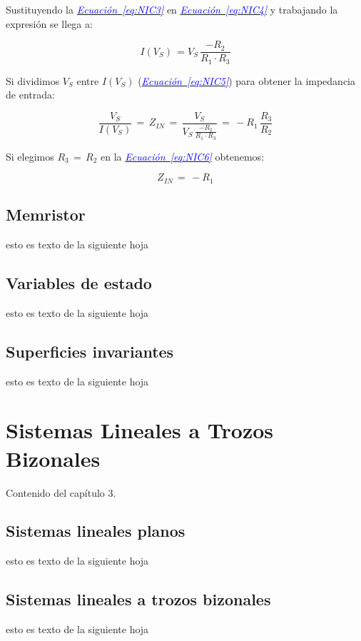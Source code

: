 \documentclass[12pt,a4paper]{report} %
\newcommand{\equationref}[1]{\hyperref[#1]{\textcolor{blue}{\textit{Ecuación~\ref*{#1}}}}}
\begin{document}
	Sustituyendo la \equationref{eq:NIC3} en \equationref{eq:NIC4} y trabajando la expresión se llega a:
	
	\begin{equation}
		I(V_S)\,=V_S\,\frac{-R_2}{R_1 \cdot R_3}
		\label{eq:NIC5}
	\end{equation}\smallskip
	
	Si dividimos $V_S$ entre $I(V_S)$ (\equationref{eq:NIC5}) para obtener la impedancia de entrada:
	
	\begin{equation}
		\frac{V_S}{I(V_S)}\,=\,Z_{IN}\,=\,\frac{V_S}{V_S\,\frac{-R_2}{R_1 \cdot R_3}}\,=\,-R_1\,\frac{R_3}{R_2}
		\label{eq:NIC6}
	\end{equation}\smallskip
	
	Si elegimos $R_3\,=\,R_2$ en la \equationref{eq:NIC6} obtenemos:
	
	\begin{equation}
		Z_{IN}\,=\,-R_1
		\label{eq:NIC7}
	\end{equation}\smallskip
	
	\newpage
	\section{Memristor}
	esto es texto de la siguiente hoja
	\newpage
	\section{Variables de estado}
	esto es texto de la siguiente hoja
	\newpage
	\section{Superficies invariantes}
	esto es texto de la siguiente hoja
	
	\chapter{Sistemas Lineales a Trozos Bizonales}
	Contenido del capítulo 3.
	\newpage
	\section{Sistemas lineales planos}
	esto es texto de la siguiente hoja
	\newpage
	\section{Sistemas lineales a trozos bizonales}
	esto es texto de la siguiente hoja
	
\end{document}
